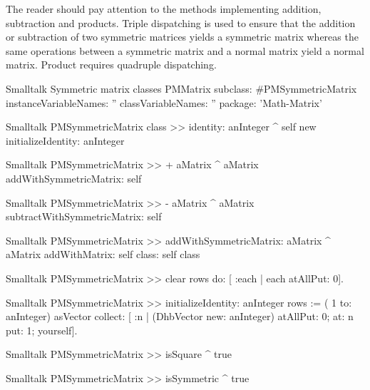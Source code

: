 The reader should pay attention to the methods implementing addition, subtraction and products.
Triple dispatching is used to ensure that the addition or subtraction of two symmetric matrices
yields a symmetric matrix whereas the same operations between a symmetric matrix and a normal matrix yield a normal matrix.
Product requires quadruple dispatching.

\begin{listing}[label=lst:symmatrix]{Smalltalk}
{Symmetric matrix classes}
PMMatrix subclass: #PMSymmetricMatrix
   instanceVariableNames: ''
   classVariableNames: ''
   package: 'Math-Matrix'
\end{listing}

\begin{displaycode}{Smalltalk}
PMSymmetricMatrix class >> identity: anInteger
    ^ self new initializeIdentity: anInteger
\end{displaycode}

\begin{displaycode}{Smalltalk}
PMSymmetricMatrix >> + aMatrix
    ^ aMatrix addWithSymmetricMatrix: self
\end{displaycode}

\begin{displaycode}{Smalltalk}
PMSymmetricMatrix >> - aMatrix
    ^ aMatrix subtractWithSymmetricMatrix: self
\end{displaycode}

\begin{displaycode}{Smalltalk}
PMSymmetricMatrix >> addWithSymmetricMatrix: aMatrix
    ^ aMatrix addWithMatrix: self class: self class
\end{displaycode}

\begin{displaycode}{Smalltalk}
PMSymmetricMatrix >> clear
    rows do: [ :each | each atAllPut: 0].
\end{displaycode}

\begin{displaycode}{Smalltalk}
PMSymmetricMatrix >> initializeIdentity: anInteger
    rows := ( 1 to: anInteger) asVector collect: [ :n | (DhbVector 
                 new: anInteger) atAllPut: 0; at: n put: 1; yourself].
\end{displaycode}

\begin{displaycode}{Smalltalk}
PMSymmetricMatrix >> isSquare
    ^ true
\end{displaycode}

\begin{displaycode}{Smalltalk}
PMSymmetricMatrix >> isSymmetric
    ^ true
\end{displaycode}

